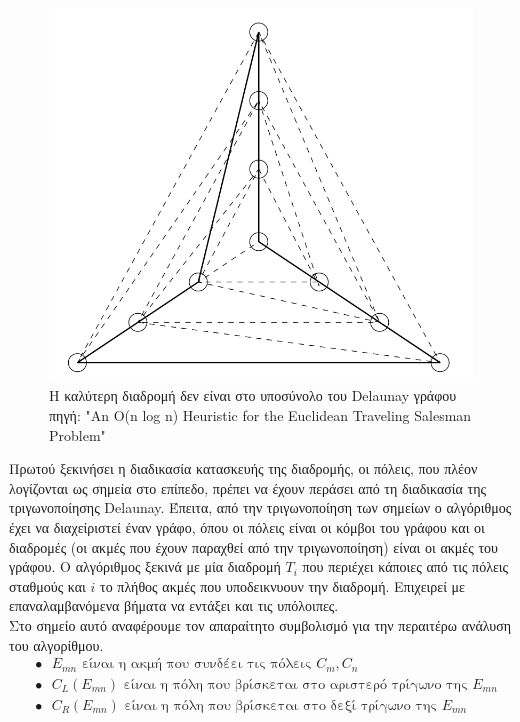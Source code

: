 \documentclass[oneside,12pt]{book}
\newenvironment{matlab}
	{\begin{figure}[hp]\centering\captionsetup{justification=centering}}
	{\end{figure}}
\theoremstyle{definition}
\begin{document}
\begin{matlab}
	\includegraphics[scale=0.5]{images/delaunay_optimum_tour.png}
	\caption{Η καλύτερη διαδρομή δεν είναι στο υποσύνολο του Delaunay γράφου \\ πηγή: "An O(n log n) Heuristic for the Euclidean Traveling Salesman Problem" \cite{10} }
\end{matlab} 

Πρωτού ξεκινήσει η διαδικασία κατασκευής της διαδρομής, οι πόλεις, που πλέον λογίζονται ως σημεία στο επίπεδο, πρέπει να έχουν περάσει από τη διαδικασία της τριγωνοποίησης Delaunay. Έπειτα, από την τριγωνοποίηση των σημείων ο αλγόριθμος έχει να διαχείριστεί έναν γράφο, όπου οι πόλεις είναι οι κόμβοι του γράφου και οι διαδρομές (οι ακμές που έχουν παραχθεί από την τριγωνοποίηση) είναι οι ακμές του γράφου. Ο αλγόριθμος ξεκινά με μία διαδρομή \(T_i\) που περιέχει κάποιες από τις πόλεις σταθμούς και \(i\) το πλήθος ακμές που υποδεικνυουν την διαδρομή. Επιχειρεί με επαναλαμβανόμενα βήματα να εντάξει και τις υπόλοιπες. \\

Στο σημείο αυτό αναφέρουμε τον απαραίτητο συμβολισμό για την περαιτέρω ανάλυση του αλγορίθμου. \\

\begin{align*}
	& \bullet \text{ } E_{mn} \text{ είναι η ακμή που συνδέει τις πόλεις } C_m, C_n \\
	& \bullet \text{ } C_L(E_{mn}) \text{ είναι η πόλη που βρίσκεται στο αριστερό τρίγωνο της } E_{mn} \\
	& \bullet \text{ } C_R(E_{mn}) \text{ είναι η πόλη που βρίσκεται στο δεξί τρίγωνο της } E_{mn}
\end{align*}
\end{document}
